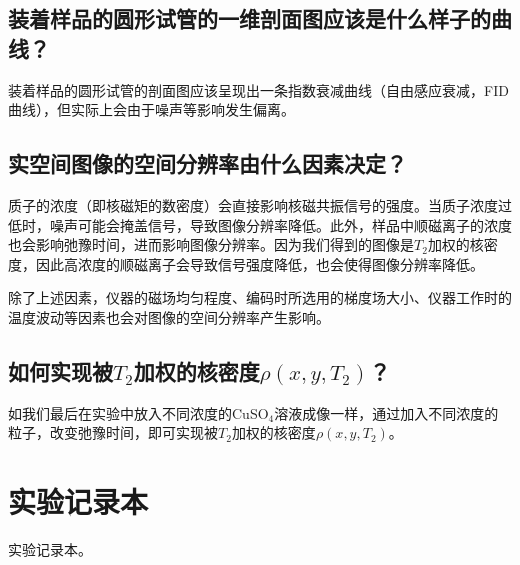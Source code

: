 \documentclass[font=default]{mpltx}
\begin{document}
\subsection{装着样品的圆形试管的一维剖面图应该是什么样子的曲线？}
装着样品的圆形试管的剖面图应该呈现出一条指数衰减曲线（自由感应衰减，FID曲线），但实际上会由于噪声等影响发生偏离。
\subsection{实空间图像的空间分辨率由什么因素决定？}
质子的浓度（即核磁矩的数密度）会直接影响核磁共振信号的强度。当质子浓度过低时，噪声可能会掩盖信号，导致图像分辨率降低。此外，样品中顺磁离子的浓度也会影响弛豫时间，进而影响图像分辨率。因为我们得到的图像是$T_2$加权的核密度，因此高浓度的顺磁离子会导致信号强度降低，也会使得图像分辨率降低。

除了上述因素，仪器的磁场均匀程度、编码时所选用的梯度场大小、仪器工作时的温度波动等因素也会对图像的空间分辨率产生影响。
\subsection{如何实现被$T_2$加权的核密度$\rho(x,y,T_2)$？}
如我们最后在实验中放入不同浓度的CuSO$_4$溶液成像一样，通过加入不同浓度的粒子，改变弛豫时间，即可实现被$T_2$加权的核密度$\rho(x,y,T_2)$。

\section{实验记录本}
实验记录本。
\end{document}
